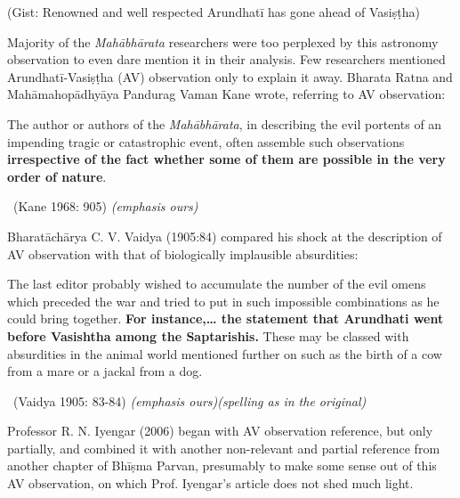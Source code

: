 \vspace{-.3cm}

(Gist: Renowned and well respected Arundhatī has gone ahead of Vasiṣṭha)

Majority of the \textit{Mahābhārata} researchers were too perplexed by this astronomy observation to even dare mention it in their analysis. Few researchers mentioned Arundhatī-Vasiṣṭha (AV) observation only to explain it away. Bharata Ratna and Mahāmahopādhyāya Pandurag Vaman Kane wrote, referring to AV observation:

\begin{myquote}
The author or authors of the \textit{Mahābhārata}, in describing the evil portents of an impending tragic or catastrophic event, often assemble such observations \textbf{irrespective of the fact whether some of them are possible in the very order of nature}. 

~\hfill (Kane 1968: 905) \textit{(emphasis ours)}
\end{myquote}

Bharatāchārya C. V. Vaidya (1905:84) compared his shock at the description of AV observation with that of biologically implausible absurdities:

\begin{myquote}
The last editor probably wished to accumulate the number of the evil omens which preceded the war and tried to put in such impossible combinations as he could bring together. \textbf{For instance,… the statement that Arundhati went before Vasishtha among the Saptarishis.} These may be classed with absurdities in the animal world mentioned further on such as the birth of a cow from a mare or a jackal from a dog. 

~\hfill (Vaidya 1905: 83-84) \textit{(emphasis ours)(spelling as in the original)}
\end{myquote}

\newpage

Professor R. N. Iyengar (2006) began with AV observation reference, but only partially, and combined it with another non-relevant and partial reference from another chapter of Bhīṣma Parvan, presumably to make some sense out of this AV observation, on which Prof. Iyengar’s article does not shed much light.

